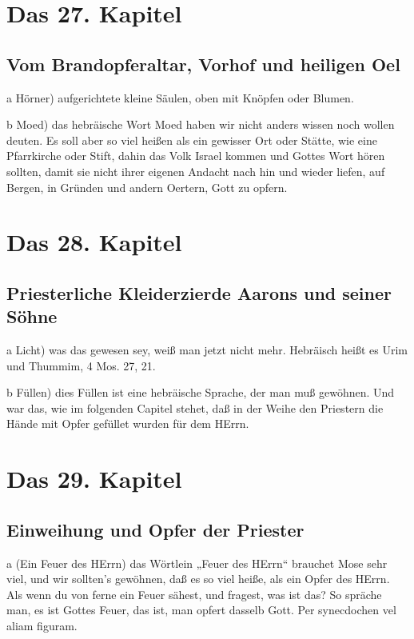 \chapter{Das 27. Kapitel}

\section{Vom Brandopferaltar, Vorhof und heiligen Oel}

a Hörner) aufgerichtete kleine Säulen, oben mit Knöpfen oder Blumen.

b Moed) das hebräische Wort Moed haben wir nicht anders wissen noch wollen deuten. Es soll aber so viel heißen als ein gewisser Ort oder Stätte, wie eine Pfarrkirche oder Stift, dahin das Volk Israel kommen und Gottes Wort hören sollten, damit sie nicht ihrer eigenen Andacht nach hin und wieder liefen, auf Bergen, in Gründen und andern Oertern, Gott zu opfern.

\chapter{Das 28. Kapitel}

\section{Priesterliche Kleiderzierde Aarons und seiner Söhne}

a Licht) was das gewesen sey, weiß man jetzt nicht mehr. Hebräisch heißt es Urim und Thummim, 4 Mos. 27, 21.

b Füllen) dies Füllen ist eine hebräische Sprache, der man muß gewöhnen. Und war das, wie im folgenden Capitel stehet, daß in der Weihe den Priestern die Hände mit Opfer gefüllet wurden für dem HErrn.

\chapter{Das 29. Kapitel}

\section{Einweihung und Opfer der Priester}

a (Ein Feuer des HErrn) das Wörtlein „Feuer des HErrn“ brauchet Mose sehr viel, und wir sollten's gewöhnen, daß es so viel heiße, als ein Opfer des HErrn. Als wenn du von ferne ein Feuer sähest, und fragest, was ist das? So spräche man, es ist Gottes Feuer, das ist, man opfert dasselb Gott. Per synecdochen vel aliam figuram.

